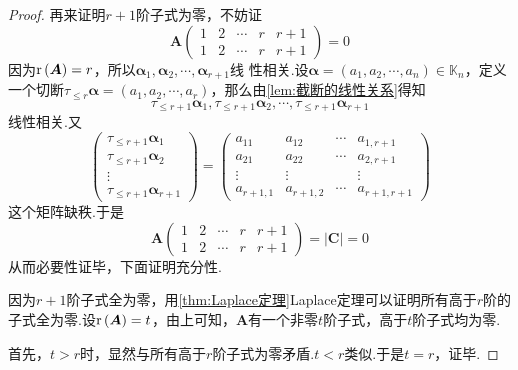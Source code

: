 {\begin{proof}
        再来证明$r+1$阶子式为零，不妨证
        \[
            \bm{A}\begin{pmatrix}
                1 & 2 & \cdots & r & r+1 \\
                1 & 2 & \cdots & r & r+1
            \end{pmatrix}=0
        \]
        因为$\mathrm{r} \left(\bm{A}\right)=r$，所以$\bm{\alpha}_1,\bm{\alpha}_{2},\cdots,\bm{\alpha}_{r+1}$线
        性相关.设$\bm{\alpha}=\left(a_1,a_2,\cdots,a_n\right)\in \mathbb{K}_n$，定义一个切断$\tau _{\leqslant r}\bm{\alpha}=\left(a_1,a_2,\cdots,
            a_r\right)$，那么由\cref{lem:截断的线性关系}得知
        \[
            \tau_{\leqslant r+1}\bm{\alpha}_1,\tau_{\leqslant r+1}\bm{\alpha}_2,
            \cdots,\tau_{\leqslant r+1}\bm{\alpha}_{r+1}
        \]
        线性相关.又
        \[
            \begin{pmatrix}
                \tau_{\leqslant r+1}\bm{\alpha}_1 \\
                \tau_{\leqslant r+1}\bm{\alpha}_2 \\
                \vdots                            \\
                \tau_{\leqslant r+1}\bm{\alpha}_{r+1}
            \end{pmatrix}=
            \begin{pmatrix}
                a_{11}    & a_{12}    & \cdots & a_{1,r+1}   \\
                a_{21}    & a_{22}    & \cdots & a_{2,r+1}   \\
                \vdots    & \vdots    &        & \vdots      \\
                a_{r+1,1} & a_{r+1,2} & \cdots & a_{r+1,r+1}
            \end{pmatrix}
        \]
        这个矩阵缺秩.于是
        \[
            \bm{A}\begin{pmatrix}
                1 & 2 & \cdots & r & r+1 \\
                1 & 2 & \cdots & r & r+1
            \end{pmatrix}=\left|\bm{C}\right|=0
        \]
        从而必要性证毕，下面证明充分性.

        因为$r+1$阶子式全为零，用\cref{thm:Laplace定理}Laplace定理可以证明所有高于$r$阶的子式全为零.设$\mathrm{r} \left(\bm{A}\right)=t$，由上可知，$\bm{A}$有一个非零$t$阶子式，高于$t$阶子式均为零.

        首先，$t>r$时，显然与所有高于$r$阶子式为零矛盾.$t<r$类似.于是$t=r$，证毕.
    \end{proof}
}
